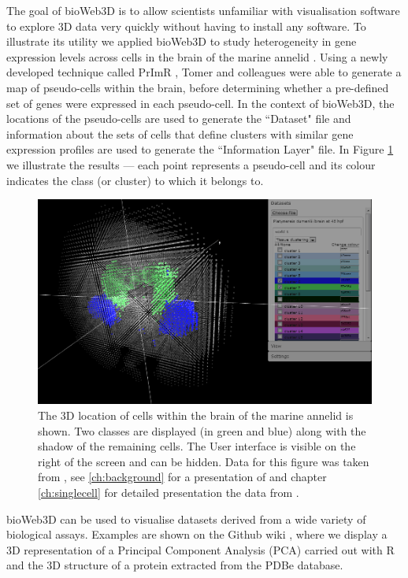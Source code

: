 	The goal of bioWeb3D is to allow scientists unfamiliar with visualisation software to explore 3D data very quickly without having to install any software.
	To illustrate its utility we applied bioWeb3D to study heterogeneity in gene expression levels across cells in the brain of the marine annelid \platyfull{}. Using a newly developed technique called PrImR \cite{Tomer10}, Tomer and colleagues were able to generate a map of pseudo-cells within the \platy{} brain, before determining whether a pre-defined set of genes were expressed in each pseudo-cell. In the context of bioWeb3D, the locations of the pseudo-cells are used to generate the ``Dataset" file and information about the sets of cells that define clusters with similar gene expression profiles are used to generate the ``Information Layer" file. In Figure \ref{fig:bioweb3d} we illustrate the results ---  each point represents a pseudo-cell and its colour indicates the class (or cluster) to which it belongs to. 
	
	\begin{figure}[h]
\centerline{\includegraphics[width=\linewidth]{gfx/chapter3/bioweb3d.png}}
\caption{The 3D location of cells within the brain of the marine annelid \platyfull{} is shown. Two classes are displayed (in green and blue) along with the shadow of the remaining cells. The User interface is visible on the right of the screen and can be hidden. Data for this figure was taken from \cite{Tomer10}, see \ref{ch:background} for a presentation of \platy{} and chapter \ref{ch:singlecell} for detailed presentation the data from \cite{Tomer}.}\label{fig:bioweb3d}
	\end{figure}

	bioWeb3D can be used to visualise datasets derived from a wide variety of biological assays. Examples are shown on the Github wiki \cite{github}, where we display a 3D representation of a Principal Component Analysis (PCA) carried out with R and the 3D structure of a protein extracted from the PDBe database.
	
